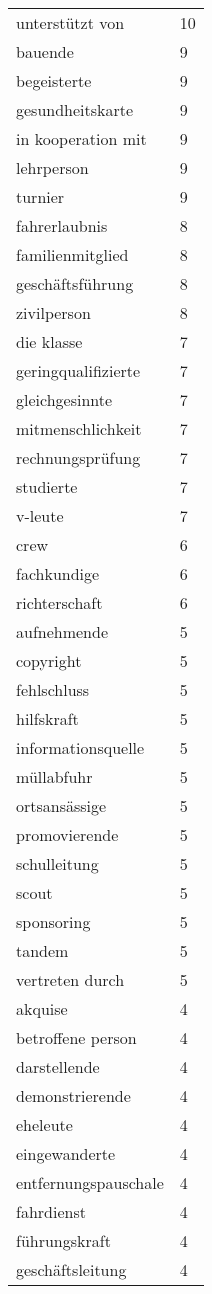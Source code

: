\begin{tabular}{ll}
unterstützt von & 10\\
bauende & 9\\
begeisterte & 9\\
gesundheitskarte & 9\\
in kooperation mit & 9\\
lehrperson & 9\\
turnier & 9\\
fahrerlaubnis & 8\\
familienmitglied & 8\\
geschäftsführung & 8\\
zivilperson & 8\\
die klasse & 7\\
geringqualifizierte & 7\\
gleichgesinnte & 7\\
mitmenschlichkeit & 7\\
rechnungsprüfung & 7\\
studierte & 7\\
v-leute & 7\\
crew & 6\\
fachkundige & 6\\
richterschaft & 6\\
aufnehmende & 5\\
copyright & 5\\
fehlschluss & 5\\
hilfskraft & 5\\
informationsquelle & 5\\
müllabfuhr & 5\\
ortsansässige & 5\\
promovierende & 5\\
schulleitung & 5\\
scout & 5\\
sponsoring & 5\\
tandem & 5\\
vertreten durch & 5\\
akquise & 4\\
betroffene person & 4\\
darstellende & 4\\
demonstrierende & 4\\
eheleute & 4\\
eingewanderte & 4\\
entfernungspauschale & 4\\
fahrdienst & 4\\
führungskraft & 4\\
geschäftsleitung & 4\\

\end{tabular}
